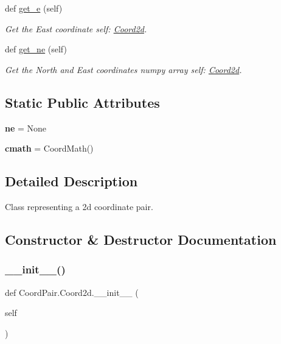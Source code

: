 \begin{DoxyCompactItemize}
def \hyperlink{classCoordPair_1_1Coord2d_add74de639a8a6380d0329f576dfe09f0}{get\+\_\+e} (self)
\begin{DoxyCompactList}\small\item\em Get the East coordinate  self\+: \hyperlink{classCoordPair_1_1Coord2d}{Coord2d}. \end{DoxyCompactList}\item 
def \hyperlink{classCoordPair_1_1Coord2d_a0e41450dc42ec29ab58a9f849a303baa}{get\+\_\+ne} (self)
\begin{DoxyCompactList}\small\item\em Get the North and East coordinates numpy array  self\+: \hyperlink{classCoordPair_1_1Coord2d}{Coord2d}. \end{DoxyCompactList}\end{DoxyCompactItemize}
\subsection*{Static Public Attributes}
\begin{DoxyCompactItemize}
\item 
\mbox{\label{classCoordPair_1_1Coord2d_a1da11b6d206d0911c95f62845848482e}} 
{\bfseries ne} = None
\item 
\mbox{\label{classCoordPair_1_1Coord2d_a5bad6498c3f1c7ee0904c453a760ada3}} 
{\bfseries cmath} = Coord\+Math()
\end{DoxyCompactItemize}


\subsection{Detailed Description}
Class representing a 2d coordinate pair. 



\subsection{Constructor \& Destructor Documentation}
\mbox{\label{classCoordPair_1_1Coord2d_a9a06768e1ca4357128127ac72631142a}} 
\subsubsection{\texorpdfstring{\+\_\+\+\_\+init\+\_\+\+\_\+()}{\_\_init\_\_()}}
{\footnotesize\ttfamily def Coord\+Pair.\+Coord2d.\+\_\+\+\_\+init\+\_\+\+\_\+ (\begin{DoxyParamCaption}\item[{}]{self }\end{DoxyParamCaption})}



